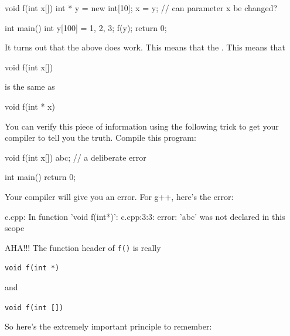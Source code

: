 \begin{consolethree}[escapeinside=||]
void f(int x[])
{
    int * y = new int[10];
    x = y; // can parameter x be changed?
}

int main()
{
    int y[100] = {1, 2, 3};
    f(y);
    return 0;
}
\end{consolethree}

It turns out that the above does work. This means that the . This means that

\begin{consolethree}[escapeinside=||]
void f(int x[])
{}
\end{consolethree}

is the same as

\begin{consolethree}[escapeinside=||]
void f(int * x)
{}
\end{consolethree}

You can verify this piece of information using the following trick to get your compiler to tell you the truth. Compile this program:

\begin{consolethree}[escapeinside=||]
void f(int x[])
{
    abc; // a deliberate error
}

int main()
{
    return 0;
}
\end{consolethree}

Your compiler will give you an error. For g++, here's
the error:

\begin{consolethree}[escapeinside=||]
c.cpp: In function 'void f(int*)':
c.cpp:3:3: error: 'abc' was not declared in this scope
\end{consolethree}

AHA!!! The function header of \texttt{f()} is really

\verb!void f(int *)!

and 

\verb!void f(int [])!

So here's the extremely important principle to remember:
\begin{center}
\end{center}


